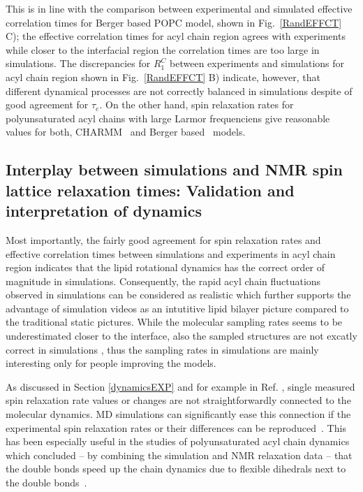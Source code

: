 \documentclass[aps,prl,superscriptaddress,twocolumn]{revtex4}
\begin{document}
This is in line with the comparison between experimental and simulated effective correlation times for Berger
based POPC model, shown in Fig.~\ref{RandEFFCT} C); the effective correlation times for acyl chain region agrees 
with experiments while closer to the interfacial region the correlation times are too large in simulations. 
The discrepancies for $R_1^{C}$ between experiments and simulations for acyl chain region shown in Fig.~\ref{RandEFFCT} B)
indicate, however, that different dynamical processes are not correctly balanced in simulations despite of good
agreement for $\tau_e$.  On the other hand, spin relaxation rates for polyunsaturated acyl chains
with large Larmor frequenciens give reasonable values for both, CHARMM~\cite{eldho03,klauda12} and Berger 
based~\cite{ollila07a} models.




\subsection{Interplay between simulations and NMR spin lattice relaxation times: Validation and interpretation of dynamics}

Most importantly, the fairly good agreement for spin relaxation rates and effective correlation times between 
simulations and experiments in acyl chain region indicates that the lipid rotational dynamics has the 
correct order of magnitude in simulations. Consequently, the rapid acyl chain fluctuations observed in 
simulations can be considered as realistic which further supports the advantage of simulation videos as an
intutitive lipid bilayer picture compared to the traditional static pictures. While the molecular sampling rates 
seems to be underestimated closer to the interface, also the sampled structures are not excatly correct
in simulations \cite{botan15}, thus the sampling rates in simulations are mainly interesting only for people 
improving the models. 

As discussed in Section \ref{dynamicsEXP} and for example in Ref. \cite{ferreira15},
single measured spin relaxation rate values or changes are not straightforwardly connected
to the molecular dynamics. MD simulations can significantly ease this connection if the
experimental spin relaxation rates or their differences can be reproduced~\cite{feller02,eldho03,nowacka13}.
This has been especially useful in the studies of polyunsaturated acyl chain dynamics which concluded --
by combining the simulation and NMR relaxation data -- that the double bonds speed up the chain dynamics
due to flexible dihedrals next to the double bonds~\cite{feller02,eldho03,gawrisch03,stillwell03}.
\end{document}
